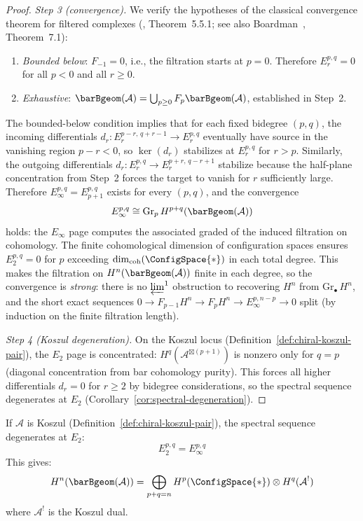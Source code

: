 \begin{proof}
\emph{Step 3 (convergence).}
We verify the hypotheses of the classical convergence theorem for filtered complexes
(\cite{Weibel94}, Theorem~5.5.1; see also Boardman~\cite{Boardman-conditional},
Theorem~7.1):
\begin{enumerate}
\item[(a)] \emph{Bounded below}: $F_{-1} = 0$, i.e., the filtration starts at
 $p = 0$. Therefore $E_r^{p,q} = 0$ for all $p < 0$ and all $r \ge 0$.
\item[(b)] \emph{Exhaustive}: $\barBgeom(\mathcal{A}) = \bigcup_{p \ge 0}
 F_p\barBgeom(\mathcal{A})$, established in Step~2.
\end{enumerate}
The bounded-below condition implies that for each fixed bidegree $(p,q)$, the
incoming differentials $d_r\colon E_r^{p-r,\,q+r-1} \to E_r^{p,q}$ eventually have
source in the vanishing region $p - r < 0$, so $\ker(d_r)$ stabilizes at
$E_r^{p,q}$ for $r > p$. Similarly, the outgoing differentials $d_r\colon
E_r^{p,q} \to E_r^{p+r,\,q-r+1}$ stabilize because the half-plane concentration
from Step~2 forces the target to vanish for $r$ sufficiently large. Therefore
$E_\infty^{p,q} = E_{p+1}^{p,q}$ exists for every $(p,q)$, and the convergence
\[E_\infty^{p,q} \cong \mathrm{Gr}_p\, H^{p+q}(\barBgeom(\mathcal{A}))\]
holds: the $E_\infty$ page computes the associated graded of the induced filtration
on cohomology. The finite cohomological dimension of configuration spaces ensures
$E_2^{p,q} = 0$ for $p$ exceeding $\dim_{\mathrm{coh}}(\ConfigSpace{*})$ in each
total degree. This makes the filtration on $H^n(\barBgeom(\mathcal{A}))$ finite in
each degree, so the convergence is \emph{strong}: there is no $\varprojlim^1$
obstruction to recovering $H^n$ from $\mathrm{Gr}_\bullet\, H^n$, and the short
exact sequences $0 \to F_{p-1}H^n \to F_p H^n \to E_\infty^{p,n-p} \to 0$ split
(by induction on the finite filtration length).

\emph{Step 4 (Koszul degeneration).}
On the Koszul locus (Definition~\ref{def:chiral-koszul-pair}), the $E_2$ page is
concentrated: $H^q(\mathcal{A}^{\boxtimes(p+1)})$ is nonzero only for $q = p$
(diagonal concentration from bar cohomology purity). This forces all higher
differentials $d_r = 0$ for $r \ge 2$ by bidegree considerations, so the spectral
sequence degenerates at $E_2$ (Corollary~\ref{cor:spectral-degeneration}).
\end{proof}

\begin{corollary}
\label{cor:spectral-degeneration}
If $\mathcal{A}$ is Koszul (Definition~\ref{def:chiral-koszul-pair}), the spectral sequence degenerates at $E_2$:
\[E_2^{p,q} = E_\infty^{p,q}\]
This gives:
\[H^n(\barBgeom(\mathcal{A})) = \bigoplus_{p+q=n} H^p(\ConfigSpace{*}) \otimes H^q(\mathcal{A}^!)\]
where $\mathcal{A}^!$ is the Koszul dual.
\end{corollary}

